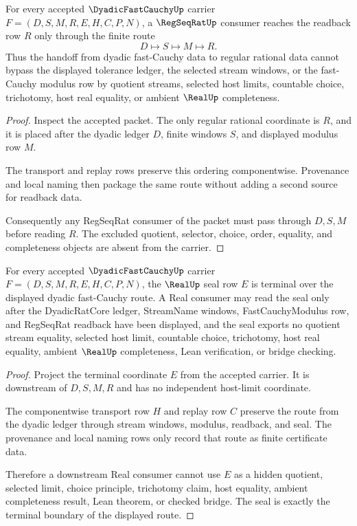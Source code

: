 \begin{theorem}\label{thm:dyadic-fast-cauchy-regseqrat-handoff}
For every accepted $\DyadicFastCauchyUp$ carrier $F=(D,S,M,R,E,H,C,P,N)$, a $\RegSeqRatUp$ consumer reaches the readback row $R$ only through the finite route
$$
D\longmapsto S\longmapsto M\longmapsto R .
$$
Thus the handoff from dyadic fast-Cauchy data to regular rational data cannot bypass the displayed tolerance ledger, the selected stream windows, or the fast-Cauchy modulus row by quotient streams, selected host limits, countable choice, trichotomy, host real equality, or ambient $\RealUp$ completeness.
\end{theorem}
\begin{proof}
Inspect the accepted packet. The only regular rational coordinate is $R$, and it is placed after the dyadic ledger $D$, finite windows $S$, and displayed modulus row $M$.

The transport and replay rows preserve this ordering componentwise. Provenance and local naming then package the same route without adding a second source for readback data.

Consequently any RegSeqRat consumer of the packet must pass through $D,S,M$ before reading $R$. The excluded quotient, selector, choice, order, equality, and completeness objects are absent from the carrier.
\end{proof}

\begin{theorem}\label{thm:dyadic-fast-cauchy-real-seal-boundary}
For every accepted $\DyadicFastCauchyUp$ carrier $F=(D,S,M,R,E,H,C,P,N)$, the $\RealUp$ seal row $E$ is terminal over the displayed dyadic fast-Cauchy route. A Real consumer may read the seal only after the DyadicRatCore ledger, StreamName windows, FastCauchyModulus row, and RegSeqRat readback have been displayed, and the seal exports no quotient stream equality, selected host limit, countable choice, trichotomy, host real equality, ambient $\RealUp$ completeness, Lean verification, or bridge checking.
\end{theorem}
\begin{proof}
Project the terminal coordinate $E$ from the accepted carrier. It is downstream of $D,S,M,R$ and has no independent host-limit coordinate.

The componentwise transport row $H$ and replay row $C$ preserve the route from the dyadic ledger through stream windows, modulus, readback, and seal. The provenance and local naming rows only record that route as finite certificate data.

Therefore a downstream Real consumer cannot use $E$ as a hidden quotient, selected limit, choice principle, trichotomy claim, host equality, ambient completeness result, Lean theorem, or checked bridge. The seal is exactly the terminal boundary of the displayed route.
\end{proof}

